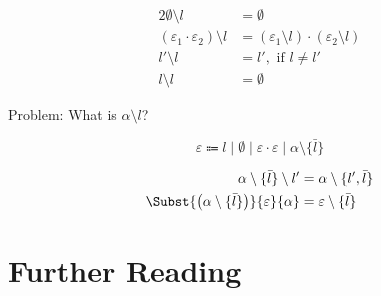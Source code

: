 \begin{alignat*}{2}
  \emptyset \setminus l &= \emptyset \\
  (\varepsilon_1 \cdot \varepsilon_2) \setminus l &=
    (\varepsilon_1 \setminus l) \cdot (\varepsilon_2 \setminus l)\\
  l' \setminus l &= l', \text{ if } l \not= l'\\
  l \setminus l  &= \emptyset
\end{alignat*}

Problem: What is $\alpha \setminus l$?

\[
  \varepsilon  \Coloneqq l \mid \emptyset \mid \varepsilon\cdot\varepsilon
    \mid \alpha \setminus \{ \bar{l} \}
\]

\begin{alignat*}{2}
  \alpha\setminus\{\bar{l}\}\setminus l' &= \alpha\setminus\{l', \bar{l}\}\\
  \Subst{\left(\alpha\setminus\{\bar{l}\}\right)}{\varepsilon}{\alpha} &=
    \varepsilon\setminus\{\bar{l}\}
\end{alignat*}


\section{Further Reading}
